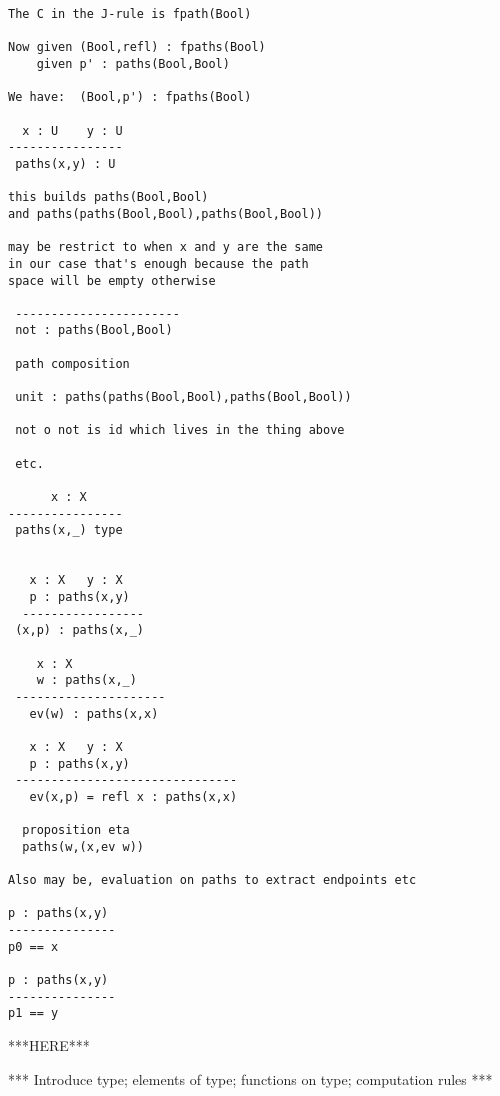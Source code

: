 \documentclass[format=acmlarge,review,natbib]{acmart}
\begin{document}
\begin{verbatim}
The C in the J-rule is fpath(Bool)

Now given (Bool,refl) : fpaths(Bool)
    given p' : paths(Bool,Bool)

We have:  (Bool,p') : fpaths(Bool)

  x : U    y : U
----------------
 paths(x,y) : U

this builds paths(Bool,Bool)
and paths(paths(Bool,Bool),paths(Bool,Bool))

may be restrict to when x and y are the same
in our case that's enough because the path
space will be empty otherwise

 -----------------------
 not : paths(Bool,Bool)

 path composition

 unit : paths(paths(Bool,Bool),paths(Bool,Bool))

 not o not is id which lives in the thing above

 etc.

      x : X
----------------
 paths(x,_) type


   x : X   y : X
   p : paths(x,y)
  -----------------
 (x,p) : paths(x,_)

    x : X
    w : paths(x,_)
 ---------------------
   ev(w) : paths(x,x)

   x : X   y : X
   p : paths(x,y)
 -------------------------------
   ev(x,p) = refl x : paths(x,x)

  proposition eta
  paths(w,(x,ev w))

Also may be, evaluation on paths to extract endpoints etc

p : paths(x,y)
---------------
p0 == x

p : paths(x,y)
---------------
p1 == y

\end{verbatim}

***HERE***

*** Introduce type; elements of type; functions on type; computation rules ***
\end{document}
